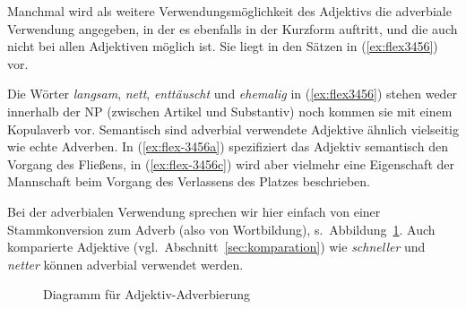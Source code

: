 \begin{exe}
  \ex \label{ex:flex9858}
  \begin{xlist}
  \end{xlist}
\end{exe}


Manchmal wird als weitere Verwendungsmöglichkeit des Adjektivs die adverbiale Verwendung angegeben, in der es ebenfalls in der Kurzform auftritt, und die auch nicht bei allen Adjektiven möglich ist.
Sie liegt in den Sätzen in (\ref{ex:flex3456}) vor.

\begin{exe}
  \ex \label{ex:flex3456}
  \begin{xlist}
  \end{xlist}
\end{exe}

Die Wörter \textit{langsam}, \textit{nett}, \textit{enttäuscht} und \textit{ehemalig} in (\ref{ex:flex3456}) stehen weder innerhalb der NP (zwischen Artikel und Substantiv) noch kommen sie mit einem Kopulaverb vor.
Semantisch sind adverbial verwendete Adjektive ähnlich vielseitig wie echte Adverben.
In (\ref{ex:flex-3456a}) spezifiziert das Adjektiv semantisch den Vorgang des Fließens, in (\ref{ex:flex-3456c}) wird aber vielmehr eine Eigenschaft der Mannschaft beim Vorgang des Verlassens des Platzes beschrieben.

Bei der adverbialen Verwendung sprechen wir hier einfach von einer Stammkonversion zum Adverb (also von Wortbildung), s.\ Abbildung~\ref{fig:konvadj}.
Auch komparierte Adjektive (vgl.\ Abschnitt~\ref{sec:komparation}) wie \textit{schneller} und \textit{netter} können adverbial verwendet werden.

\begin{figure}[!h]
  \centering
  \caption{Diagramm für Adjektiv-Adverbierung}
  \label{fig:konvadj}
\end{figure}

